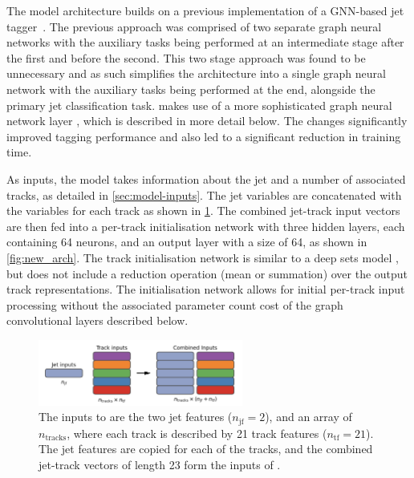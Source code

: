 The model architecture builds on a previous implementation of a GNN-based jet tagger~\cite{serviansky2020set2graph}.
The previous approach was comprised of two separate graph neural networks with the auxiliary tasks being performed at an intermediate stage after the first and before the second.
This two stage approach was found to be unnecessary and as such \GNN simplifies the architecture into a single graph neural network with the auxiliary tasks being performed at the end, alongside the primary jet classification task.
\GNN makes use of a more sophisticated graph neural network layer \cite{2021arXiv210514491B}, which is described in more detail below.
The changes significantly improved tagging performance and also led to a significant reduction in training time.

As inputs, the model takes information about the jet and a number of associated tracks, as detailed in \cref{sec:model-inputs}.
The jet variables are concatenated with the variables for each track as shown in \cref{fig:model_input_array}.
The combined jet-track input vectors are then fed into a per-track initialisation network with three hidden layers, each containing 64 neurons, and an output layer with a size of 64, as shown in \cref{fig:new_arch}. 
The track initialisation network is similar to a deep sets model \cite{zaheer2018deep}, but does not include a reduction operation (mean or summation) over the output track representations.
The initialisation network allows for initial per-track input processing without the associated parameter count cost of the graph convolutional layers described below. 

\begin{figure}[!htbp]
    \centering
    \includegraphics[width=0.6\textwidth]{chapters/gnn_tagger/figs/inputs_diagram.png}
    \caption{The inputs to \GNN are the two jet features ($n_\text{jf} = 2$), and an array of $n_{\text{tracks}}$, where each track is described by 21 track features ($n_\text{tf} = 21$). The jet features are copied for each of the tracks, and the combined jet-track vectors of length 23 form the inputs of \GNN.}
    \label{fig:model_input_array}
\end{figure}

